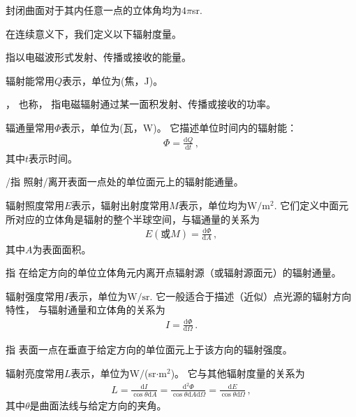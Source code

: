 \begin{corollary}
      封闭曲面对于其内任意一点的立体角均为$4\pi$sr.
\end{corollary}

在连续意义下，我们定义以下辐射度量。

\begin{definition}
      指以电磁波形式发射、传播或接收的能量。
\end{definition}
辐射能常用$Q$表示，单位为(焦，J)。

\begin{definition}
      ，
      也称，
      指电磁辐射通过某一面积发射、传播或接收的功率。
\end{definition}
辐通量常用$\varPhi$表示，单位为(瓦，W)。
它描述单位时间内的辐射能：
\begin{align}
      \varPhi=\frac{\mathrm{d}Q}{\mathrm{d}t}\, ,
\end{align}
其中$t$表示时间。

\begin{definition}
      /指
      照射/离开表面一点处的单位面元上的辐射能通量。
\end{definition}
辐射照度常用$E$表示，辐射出射度常用$M$表示，单位均为$\text{W}/\text{m}^2$.
它们定义中面元所对应的立体角是辐射的整个半球空间，与辐通量的关系为
\begin{align}
      E(\text{或}M)=\frac{\mathrm{d}\varPhi}{\mathrm{d}A}\, ,
\end{align}
其中$A$为表面面积。

\begin{definition}
      指
      在给定方向的单位立体角元内离开点辐射源（或辐射源面元）的辐射通量。
\end{definition}
辐射强度常用$I$表示，单位为$\text{W}/\text{sr}$.
它一般适合于描述（近似）点光源的辐射方向特性，
与辐射通量和立体角的关系为
\begin{align}
      I=\frac{\mathrm{d}\varPhi}{\mathrm{d}\varOmega}\, .
\end{align}

\begin{definition}
      指
      表面一点在垂直于给定方向的单位面元上于该方向的辐射强度。
\end{definition}
辐射亮度常用$L$表示，单位为W$/$(sr$\cdot$m$^2$)。
它与其他辐射度量的关系为
\begin{align}\label{eq:5.ex-radiance}
      L=\frac{\mathrm{d}I}{\cos\theta\mathrm{d}A}=\frac{\mathrm{d}^2\varPhi}{\cos\theta\mathrm{d}A\mathrm{d}\varOmega}=\frac{\mathrm{d}E}{\cos\theta\mathrm{d}\varOmega}\, ,
\end{align}
其中$\theta$是曲面法线与给定方向的夹角。


